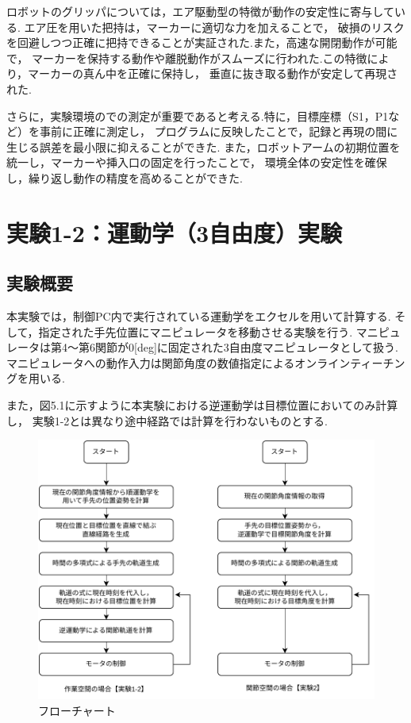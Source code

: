 ロボットのグリッパについては，エア駆動型の特徴が動作の安定性に寄与している.
エア圧を用いた把持は，マーカーに適切な力を加えることで，
破損のリスクを回避しつつ正確に把持できることが実証された.また，高速な開閉動作が可能で，
マーカーを保持する動作や離脱動作がスムーズに行われた.この特徴により，マーカーの真ん中を正確に保持し，
垂直に抜き取る動作が安定して再現された.

さらに，実験環境のでの測定が重要であると考える.特に，目標座標（S1，P1など）を事前に正確に測定し，
プログラムに反映したことで，記録と再現の間に生じる誤差を最小限に抑えることができた.
また，ロボットアームの初期位置を統一し，マーカーや挿入口の固定を行ったことで，
環境全体の安定性を確保し，繰り返し動作の精度を高めることができた.

\section{実験1-2：運動学（3自由度）実験}

\subsection{実験概要}
本実験では，制御PC内で実行されている運動学をエクセルを用いて計算する.
そして，指定された手先位置にマニピュレータを移動させる実験を行う.
マニピュレータは第4～第6関節が0[deg]に固定された3自由度マニピュレータとして扱う.
マニピュレータへの動作入力は関節角度の数値指定によるオンラインティーチングを用いる.

また，図5.1に示すように本実験における逆運動学は目標位置においてのみ計算し，
実験1-2とは異なり途中経路では計算を行わないものとする.

\begin{figure}[h]
  \centering
  \includegraphics[scale=0.75]{sozai/3.pdf}
  \caption{フローチャート}
\end{figure}


